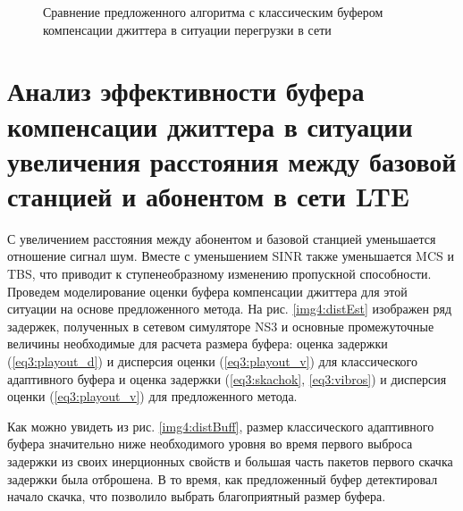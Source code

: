 \pgfplotsset{width=15cm, height=10cm, compat=1.3}
\begin{figure} [!ht]
  \center
{}
\caption{Сравнение предложенного алгоритма с классическим буфером компенсации джиттера в ситуации перегрузки в сети}
  \label{img4:congBuff}
\end{figure}














\section{Анализ эффективности буфера компенсации джиттера в ситуации увеличения расстояния между базовой станцией и абонентом в сети LTE} \label{sect4}

С увеличением расстояния между абонентом и базовой станцией уменьшается отношение сигнал шум. Вместе с уменьшением SINR также уменьшается MCS и TBS, что приводит к ступенеобразному изменению пропускной способности.
Проведем моделирование оценки буфера компенсации джиттера для этой ситуации на основе предложенного метода.
На рис. \ref{img4:distEst} изображен ряд задержек, полученных в сетевом симуляторе NS3 и основные промежуточные величины необходимые для расчета размера буфера: 
оценка задержки (\ref{eq3:playout_d}) и дисперсия оценки (\ref{eq3:playout_v}) для классического адаптивного буфера \cite{Ramjee} и 
оценка задержки (\ref{eq3:skachok}, \ref{eq3:vibros}) и дисперсия оценки (\ref{eq3:playout_v}) для предложенного метода.


Как можно увидеть из рис. \ref{img4:distBuff}, размер классического адаптивного буфера значительно ниже необходимого уровня во время первого выброса задержки из своих инерционных свойств и большая часть пакетов первого скачка задержки была отброшена.
В то время, как предложенный буфер детектировал начало скачка, что позволило выбрать благоприятный размер буфера.


